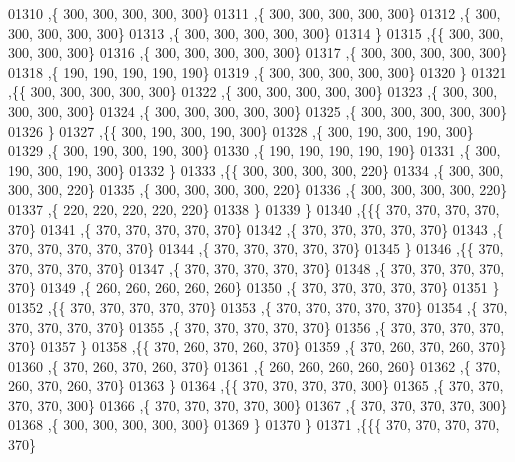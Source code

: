 \begin{DoxyCode}
01310    ,\{   300,   300,   300,   300,   300\}
01311    ,\{   300,   300,   300,   300,   300\}
01312    ,\{   300,   300,   300,   300,   300\}
01313    ,\{   300,   300,   300,   300,   300\}
01314    \}
01315   ,\{\{   300,   300,   300,   300,   300\}
01316    ,\{   300,   300,   300,   300,   300\}
01317    ,\{   300,   300,   300,   300,   300\}
01318    ,\{   190,   190,   190,   190,   190\}
01319    ,\{   300,   300,   300,   300,   300\}
01320    \}
01321   ,\{\{   300,   300,   300,   300,   300\}
01322    ,\{   300,   300,   300,   300,   300\}
01323    ,\{   300,   300,   300,   300,   300\}
01324    ,\{   300,   300,   300,   300,   300\}
01325    ,\{   300,   300,   300,   300,   300\}
01326    \}
01327   ,\{\{   300,   190,   300,   190,   300\}
01328    ,\{   300,   190,   300,   190,   300\}
01329    ,\{   300,   190,   300,   190,   300\}
01330    ,\{   190,   190,   190,   190,   190\}
01331    ,\{   300,   190,   300,   190,   300\}
01332    \}
01333   ,\{\{   300,   300,   300,   300,   220\}
01334    ,\{   300,   300,   300,   300,   220\}
01335    ,\{   300,   300,   300,   300,   220\}
01336    ,\{   300,   300,   300,   300,   220\}
01337    ,\{   220,   220,   220,   220,   220\}
01338    \}
01339   \}
01340  ,\{\{\{   370,   370,   370,   370,   370\}
01341    ,\{   370,   370,   370,   370,   370\}
01342    ,\{   370,   370,   370,   370,   370\}
01343    ,\{   370,   370,   370,   370,   370\}
01344    ,\{   370,   370,   370,   370,   370\}
01345    \}
01346   ,\{\{   370,   370,   370,   370,   370\}
01347    ,\{   370,   370,   370,   370,   370\}
01348    ,\{   370,   370,   370,   370,   370\}
01349    ,\{   260,   260,   260,   260,   260\}
01350    ,\{   370,   370,   370,   370,   370\}
01351    \}
01352   ,\{\{   370,   370,   370,   370,   370\}
01353    ,\{   370,   370,   370,   370,   370\}
01354    ,\{   370,   370,   370,   370,   370\}
01355    ,\{   370,   370,   370,   370,   370\}
01356    ,\{   370,   370,   370,   370,   370\}
01357    \}
01358   ,\{\{   370,   260,   370,   260,   370\}
01359    ,\{   370,   260,   370,   260,   370\}
01360    ,\{   370,   260,   370,   260,   370\}
01361    ,\{   260,   260,   260,   260,   260\}
01362    ,\{   370,   260,   370,   260,   370\}
01363    \}
01364   ,\{\{   370,   370,   370,   370,   300\}
01365    ,\{   370,   370,   370,   370,   300\}
01366    ,\{   370,   370,   370,   370,   300\}
01367    ,\{   370,   370,   370,   370,   300\}
01368    ,\{   300,   300,   300,   300,   300\}
01369    \}
01370   \}
01371  ,\{\{\{   370,   370,   370,   370,   370\}

\end{DoxyCode}

